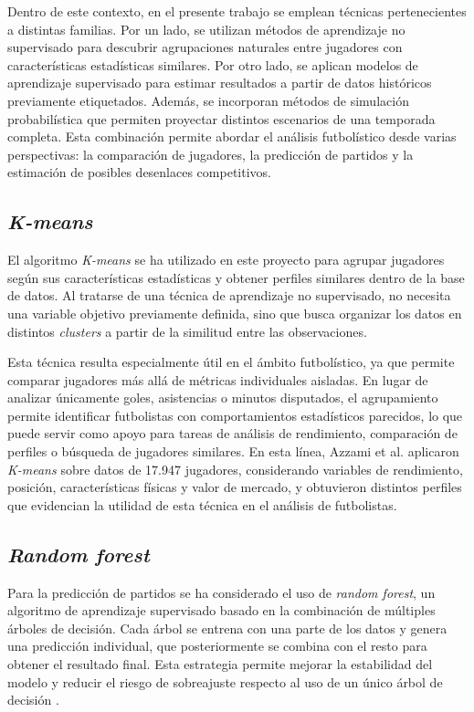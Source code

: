 Dentro de este contexto, en el presente trabajo se emplean técnicas pertenecientes a distintas familias. Por un lado, se utilizan métodos de aprendizaje no supervisado para descubrir agrupaciones naturales entre jugadores con características estadísticas similares. Por otro lado, se aplican modelos de aprendizaje supervisado para estimar resultados a partir de datos históricos previamente etiquetados. Además, se incorporan métodos de simulación probabilística que permiten proyectar distintos escenarios de una temporada completa. Esta combinación permite abordar el análisis futbolístico desde varias perspectivas: la comparación de jugadores, la predicción de partidos y la estimación de posibles desenlaces competitivos.

\subsection{\textit{K-means}}

El algoritmo \textit{K-means} se ha utilizado en este proyecto para agrupar jugadores según sus características estadísticas y obtener perfiles similares dentro de la base de datos. Al tratarse de una técnica de aprendizaje no supervisado, no necesita una variable objetivo previamente definida, sino que busca organizar los datos en distintos \textit{clusters} a partir de la similitud entre las observaciones.

Esta técnica resulta especialmente útil en el ámbito futbolístico, ya que permite comparar jugadores más allá de métricas individuales aisladas. En lugar de analizar únicamente goles, asistencias o minutos disputados, el agrupamiento permite identificar futbolistas con comportamientos estadísticos parecidos, lo que puede servir como apoyo para tareas de análisis de rendimiento, comparación de perfiles o búsqueda de jugadores similares. En esta línea, Azzami et al. \cite{azzami_clustering_2025} aplicaron \textit{K-means} sobre datos de 17.947 jugadores, considerando variables de rendimiento, posición, características físicas y valor de mercado, y obtuvieron distintos perfiles que evidencian la utilidad de esta técnica en el análisis de futbolistas.

\subsection{\textit{Random forest}}

Para la predicción de partidos se ha considerado el uso de \textit{random forest}, un algoritmo de aprendizaje supervisado basado en la combinación de múltiples árboles de decisión. Cada árbol se entrena con una parte de los datos y genera una predicción individual, que posteriormente se combina con el resto para obtener el resultado final. Esta estrategia permite mejorar la estabilidad del modelo y reducir el riesgo de sobreajuste respecto al uso de un único árbol de decisión \cite{pugsee_football_2019}.

